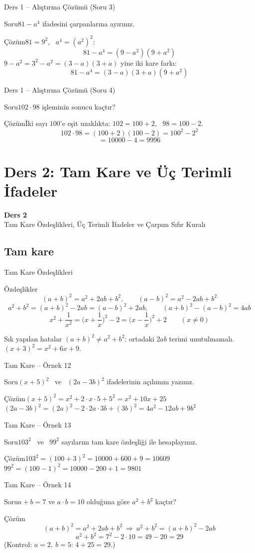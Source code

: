 \documentclass[aspectratio=169,11pt]{beamer}
\newcommand{\soru}[3]{%
\begin{frame}{#1}
  \begin{block}{Soru}\large #2\end{block}
  \pause
  \begin{exampleblock}{Çözüm}\large #3\end{exampleblock}
\end{frame}}
\begin{document}
\soru{Ders 1 -- Alıştırma Çözümü (Soru 3)}
{\(81-a^4\) ifadesini çarpanlarına ayırınız.}
{\(81=9^2\), \ \(a^4=(a^2)^2\):
\[81-a^4=(9-a^2)(9+a^2)\]
\(9-a^2=3^2-a^2=(3-a)(3+a)\) yine iki kare farkı:
\[81-a^4=(3-a)(3+a)(9+a^2)\]}

\soru{Ders 1 -- Alıştırma Çözümü (Soru 4)}
{\(102\cdot 98\) işleminin sonucu kaçtır?}
{İki sayı \(100\)'e eşit uzaklıkta: \(102=100+2\), \ \(98=100-2\).
\[102\cdot 98=(100+2)(100-2)=100^2-2^2\]
\[=10000-4=9996\]}


\section{Ders 2: Tam Kare ve Üç Terimli İfadeler}
\begin{frame}
\centering\Large\color{anamavi}\textbf{Ders 2}\\[6pt]\normalsize Tam Kare Özdeşlikleri, Üç Terimli İfadeler ve Çarpım Sıfır Kuralı
\end{frame}

\subsection{Tam kare}
\begin{frame}{Tam Kare Özdeşlikleri}
\begin{block}{Özdeşlikler}
\[(a+b)^2=a^2+2ab+b^2,\qquad (a-b)^2=a^2-2ab+b^2\]
\[a^2+b^2=(a+b)^2-2ab=(a-b)^2+2ab,\qquad (a+b)^2-(a-b)^2=4ab\]
\[x^2+\frac{1}{x^2}=\Big(x+\frac{1}{x}\Big)^2-2=\Big(x-\frac{1}{x}\Big)^2+2\qquad(x\neq 0)\]
\end{block}
\begin{alertblock}{Sık yapılan hatalar}
\((a+b)^2\neq a^2+b^2\): ortadaki \(2ab\) terimi unutulmamalı. \quad \((x+3)^2=x^2+6x+9\).
\end{alertblock}
\end{frame}

\soru{Tam Kare -- Örnek 12}
{\((x+5)^2\) \ ve \ \((2a-3b)^2\) ifadelerinin açılımını yazınız.}
{\((x+5)^2=x^2+2\cdot x\cdot 5+5^2=x^2+10x+25\)\\[4pt]
\((2a-3b)^2=(2a)^2-2\cdot 2a\cdot 3b+(3b)^2=4a^2-12ab+9b^2\)}

\soru{Tam Kare -- Örnek 13}
{\(103^2\) \ ve \ \(99^2\) sayılarını tam kare özdeşliği ile hesaplayınız.}
{\(103^2=(100+3)^2=10000+600+9=10609\)\\[4pt]
\(99^2=(100-1)^2=10000-200+1=9801\)}

\soru{Tam Kare -- Örnek 14}
{\(a+b=7\) ve \(a\cdot b=10\) olduğuna göre \(a^2+b^2\) kaçtır?}
{\[(a+b)^2=a^2+2ab+b^2\ \Rightarrow\ a^2+b^2=(a+b)^2-2ab\]
\[a^2+b^2=7^2-2\cdot 10=49-20=29\]
(Kontrol: \(a=2,\ b=5\): \(4+25=29\).)}
\end{document}
